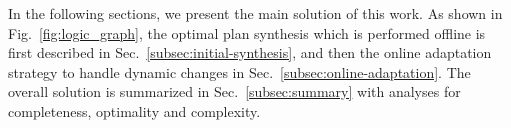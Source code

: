 

In the following sections, we present the main solution of this work.
As shown in Fig.~\ref{fig:logic_graph}, the optimal plan synthesis which is performed offline is first
described in Sec.~\ref{subsec:initial-synthesis},
and then the online adaptation strategy to handle dynamic changes in Sec.~\ref{subsec:online-adaptation}.
The overall solution is summarized in Sec.~\ref{subsec:summary} with analyses
for completeness, optimality and complexity.











